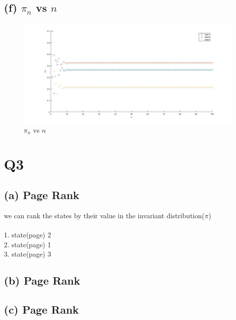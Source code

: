 \documentclass[a4paper,11pt]{article}
\begin{document}
\subsection*{(f) $\pi_n$  vs $n$}
\begin{figure}[htbp]
        \includegraphics[scale=0.35]{2f}
        \caption{$\pi_n$ vs $n$}
\end{figure}
\newpage 
\section*{Q3}
\subsection*{(a) Page Rank}
we can rank the states by their value in the invariant distribution($\pi$)\\\\
1. state(page) 2\\
2. state(page) 1\\
3. state(page) 3\\
\subsection*{(b) Page Rank}
\subsection*{(c) Page Rank}
\end{document}
